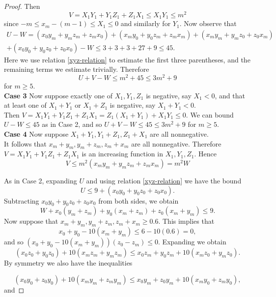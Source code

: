 \documentclass[10pt,a4paper]{amsart}
\begin{document}
\begin{proof}
Then $$V = X_1Y_1 + Y_1Z_1 + Z_1X_1 \leq X_1Y_1 \leq m^2$$ since $-m \leq x_m - (m-1) \leq X_1 \leq 0$ and similarly for $Y_1.$ Now observe that
\begin{multline*}
    U-W = (x_0y_m + y_mz_m + z_mx_0 ) + (x_my_0 + y_0z_m + z_mx_m) +  (x_my_m + y_mz_0 + z_0x_m) \\ 
    + (x_0y_0 + y_0z_0 + z_0x_0) - W  \leq 3 + 3 + 3 + 27 + 9 \leq 45.
\end{multline*}
Here we use relation \eqref{xyz-relation} to estimate the first three parentheses, and the remaining terms we estimate trivially.
Therefore $$U + V - W \leq m^2 + 45 \leq 3m^2 + 9$$ for $m \geq 5.$ \\
\textbf{Case 3} Now suppose exactly one of $X_1,Y_1,Z_1$ is negative, say $X_1 < 0$, and that at least one of $X_1 + Y_1$ or $X_1 + Z_1$ is negative, say $X_1 + Y_1 < 0$. \\ 
Then $V = X_1Y_1 + Y_1Z_1 + Z_1X_1 = Z_1(X_1 + Y_1) + X_1Y_1 \leq 0.$ We can bound $U - W \leq 45$ as in Case 2, and so $U + V - W \leq 45 \leq 3m^2 + 9$ for $m \geq 5.$ \\
\textbf{Case 4} Now suppose $X_1 + Y_1, Y_1 + Z_1, Z_1 + X_1$ are all nonnegative.\\ 
It follows that $x_m + y_m, y_m + z_m, z_m + x_m$ are all nonnegative. Therefore $V = X_1Y_1 + Y_1Z_1 + Z_1X_1$ is an increasing function in $X_1,Y_1,Z_1.$ Hence \begin{equation} \label{Vbound}
    V \leq m^2(x_my_m + y_mz_m + z_mx_m) = m^2W 
\end{equation}



As in Case 2, expanding $U$ and using relation \eqref{xyz-relation} we have the bound \begin{equation} \label{Ubound}
    U \leq 9 + (x_0y_0 + y_0z_0 + z_0x_0).
\end{equation}
Subtracting $x_0y_0 + y_0z_0 + z_0x_0$ from both sides, we obtain \begin{equation}
    W + x_0(y_m + z_m) + y_0(x_m + z_m) + z_0(x_m + y_m) \leq 9. \label{U - 00 ineq}
\end{equation}
Now suppose that $x_m + y_m, y_m + z_m, z_m + x_m \geq 0.6.$ This implies that $$x_0 + y_0 - 10(x_m+y_m) \leq 6 - 10(0.6) = 0,$$ and so $(x_0 + y_0 - 10(x_m + y_m))(z_0 - z_m) \leq 0.$ Expanding we obtain $$(x_0z_0 + y_0z_0)+10(x_mz_m + y_mz_m) \leq x_0z_m + y_0z_m + 10(x_mz_0 + y_mz_0).$$ By symmetry we also have the inequalities

$$(x_0y_0 + z_0y_0)+10(x_my_m + z_my_m) \leq x_0y_m + z_0y_m + 10(x_my_0 + z_my_0),$$ and


\end{proof}
\end{document}

